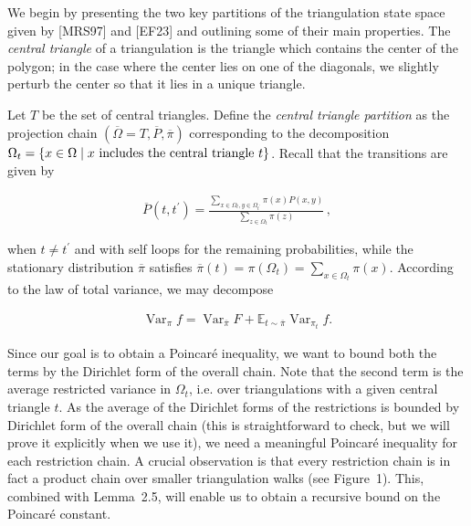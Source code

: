 \documentclass[10pt,a4paper]{article}
\begin{document}
We begin by presenting the two key partitions of the triangulation state space given by [MRS97] and [EF23] and outlining some of their main properties. The \emph{central triangle} of a triangulation is the triangle which contains the center of the polygon; in the case where the center lies on one of the diagonals, we slightly perturb the center so that it lies in a unique triangle.\par




Let $T$ be the set of central triangles. Define the \emph{central triangle partition} as the projection chain $\left(\overline{\Omega}=T,\overline{P},\overline{\pi}\right)$ corresponding to the decomposition $\Omega_{t}=\{x\in\Omega\mid x\textnormal{ includes the central triangle }t\}$. Recall that the transitions are given by\par


\[\begin{gathered}
\overline{P}(t,t^{\prime})=\frac{\sum_{x\in\Omega_{t},y\in\Omega_{t^{\prime}}}\pi(x)P(x,y)}{\sum_{z\in\Omega_{t}}\pi(z)}\,,
\end{gathered}\]


when $t\neq t^{\prime}$ and with self loops for the remaining probabilities, while the stationary distribution $\overline{\pi}$ satisfies $\overline{\pi}(t)=\pi(\Omega_{t})=\sum_{x\in\Omega_{t}}\pi(x)$. According to the law of total variance, we may decompose\par


\[\begin{gathered}
\operatorname{Var}_{\pi}f=\operatorname{Var}_{\overline{\pi}}F+\mathbb{E}_{t\sim\overline{\pi}}\operatorname{Var}_{\pi_{t}}f.
\end{gathered}\]




Since our goal is to obtain a Poincaré inequality, we want to bound both the terms by the Dirichlet form of the overall chain. Note that the second term is the average restricted variance in $\Omega_{t}$, i.e. over triangulations with a given central triangle $t$. As the average of the Dirichlet forms of the restrictions is bounded by Dirichlet form of the overall chain (this is straightforward to check, but we will prove it explicitly when we use it), we need a meaningful Poincaré inequality for each restriction chain. A crucial observation is that every restriction chain is in fact a product chain over smaller triangulation walks (see Figure 1). This, combined with Lemma 2.5, will enable us to obtain a recursive bound on the Poincaré constant.\par
\end{document}
